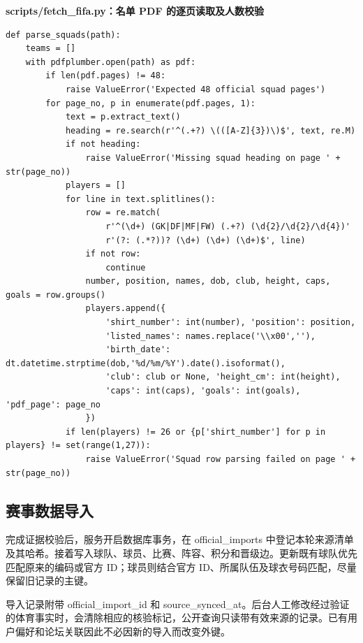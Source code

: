 \documentclass[UTF8,a4paper,11pt]{ctexart}
\begin{document}
\noindent\textbf{scripts/fetch\_fifa.py：名单 PDF 的逐页读取及人数校验}\par\vspace{2pt}
\begin{lstlisting}
def parse_squads(path):
    teams = []
    with pdfplumber.open(path) as pdf:
        if len(pdf.pages) != 48:
            raise ValueError('Expected 48 official squad pages')
        for page_no, p in enumerate(pdf.pages, 1):
            text = p.extract_text()
            heading = re.search(r'^(.+?) \(([A-Z]{3})\)$', text, re.M)
            if not heading:
                raise ValueError('Missing squad heading on page ' + str(page_no))
            players = []
            for line in text.splitlines():
                row = re.match(
                    r'^(\d+) (GK|DF|MF|FW) (.+?) (\d{2}/\d{2}/\d{4})'
                    r'(?: (.*?))? (\d+) (\d+) (\d+)$', line)
                if not row:
                    continue
                number, position, names, dob, club, height, caps, goals = row.groups()
                players.append({
                    'shirt_number': int(number), 'position': position,
                    'listed_names': names.replace('\\x00',''),
                    'birth_date': dt.datetime.strptime(dob,'%d/%m/%Y').date().isoformat(),
                    'club': club or None, 'height_cm': int(height),
                    'caps': int(caps), 'goals': int(goals), 'pdf_page': page_no
                })
            if len(players) != 26 or {p['shirt_number'] for p in players} != set(range(1,27)):
                raise ValueError('Squad row parsing failed on page ' + str(page_no))
\end{lstlisting}

\subsection{赛事数据导入}
完成证据校验后，服务开启数据库事务，在 official\_imports 中登记本轮来源清单及其哈希。接着写入球队、球员、比赛、阵容、积分和晋级边。更新既有球队优先匹配原来的编码或官方 ID；球员则结合官方 ID、所属队伍及球衣号码匹配，尽量保留旧记录的主键。

导入记录附带 official\_import\_id 和 source\_synced\_at。后台人工修改经过验证的体育事实时，会清除相应的核验标记，公开查询只读带有效来源的记录。已有用户偏好和论坛关联因此不必因新的导入而改变外键。
\end{document}
